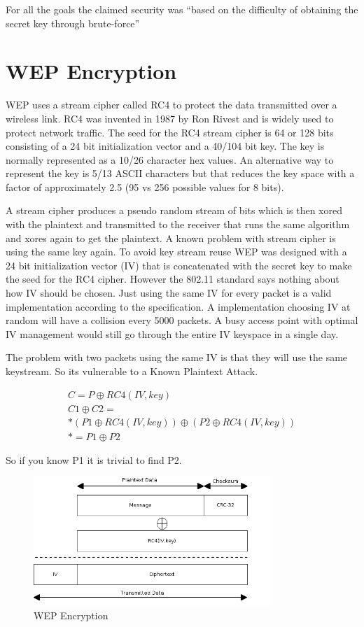 \documentclass[twocolumn,11pt]{IEEEtran}
\begin{document}
For all the goals the claimed security was ``based on the difficulty of obtaining the secret key through brute-force''\cite{IEEE:Fast}


\section {WEP Encryption}
\label{sec:WEP_Encryption}

WEP uses a stream cipher called RC4 to protect the data transmitted over a wireless link. RC4 was invented in 1987 by Ron Rivest and is widely used to protect network traffic. The seed for the RC4 stream cipher is 64 or 128 bits consisting of a 24 bit initialization vector and a 40/104 bit key. The key is normally represented as a 10/26 character hex values. An alternative way to represent the key is 5/13 ASCII characters but that reduces the key space with a factor of approximately 2.5 (95 vs 256 possible values for 8 bits).

A stream cipher produces a pseudo random stream of bits which is then xored with the plaintext and transmitted to the receiver that runs the same algorithm and xores again to get the plaintext. A known problem with stream cipher is using the same key again. To avoid key stream reuse WEP was designed with a 24 bit initialization vector (IV) that is concatenated with the secret key to make the seed for the RC4 cipher. However the 802.11 standard says nothing about how IV should be chosen. Just using the same IV for every packet is a valid implementation according to the specification. A implementation choosing IV at random will have a collision every 5000 packets\cite{Borisov:New}. A busy access point with optimal IV management would still go through the entire IV keyspace in a single day.

The problem with two packets using the same IV is that they will use the same keystream. So its vulnerable to a Known Plaintext Attack.

\begin{align*}
C = P \oplus RC4(IV,key) \\
C1 \oplus C2 = \\*
(P1 \oplus RC4(IV,key) ) \oplus ( P2 \oplus RC4(IV,key)) \\*
= P1 \oplus P2
\end{align*}

So if you know P1 it is trivial to find P2. 

\begin{figure}
\includegraphics[width=90mm]{WEP_Encryption.png}
\caption{WEP Encryption}
\end{figure}
\end{document}

